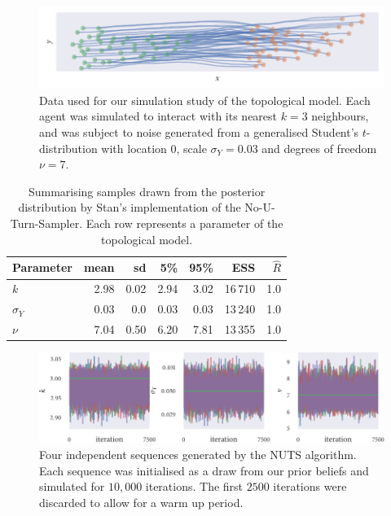 \begin{figure}[tbp]
  \includegraphics{top_sim.pdf}
  \caption{Data used for our simulation study of the topological model. Each agent was
    simulated to interact with its nearest $k=3$ neighbours, and was subject to noise
    generated from a generalised Student's $t$-distribution with location $0$, scale
    $\sigma_Y=0.03$ and degrees of freedom $\nu=7$.}
  \label{fig:top_sim}
\end{figure}
\begin{table}[tbp]
  \begin{tabular}{@{}lrrrrrr@{}}
    \toprule
    Parameter    & mean & sd   & 5\%  & 95\% & ESS     & $\widehat{R}$ \\
    \midrule
    $k$          & 2.98 & 0.02 & 2.94 & 3.02 & 16\,710 & 1.0           \\
    $\sigma_{Y}$ & 0.03 & 0.0  & 0.03 & 0.03 & 13\,240 & 1.0           \\
    $\nu$        & 7.04 & 0.50 & 6.20 & 7.81 & 13\,355 & 1.0           \\
    \bottomrule
  \end{tabular}
  \caption{Summarising samples drawn from the posterior distribution by Stan's
    implementation of the No-U-Turn-Sampler. Each row represents a parameter of the
    topological model.}
  \label{tab:top_sim_study_summary}
\end{table}
\begin{figure}[tbp]
  \includegraphics{top_trace.pdf}
  \caption{Four independent sequences generated by the NUTS algorithm. Each sequence was
    initialised as a draw from our prior beliefs and simulated for $10,000$ iterations.
    The first $2500$ iterations were discarded to allow for a warm up period.}
    \label{fig:top_sim_study_chains}
\end{figure}
